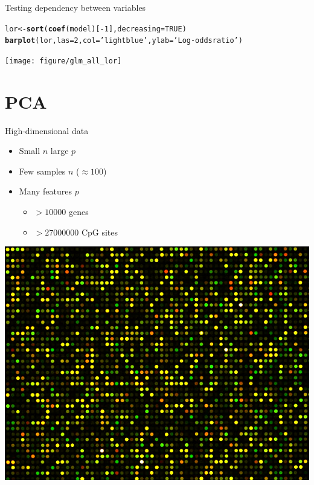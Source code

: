 \documentclass{beamer}\usepackage[]{graphicx}\usepackage[]{color}
\makeatletter
\newcommand{\hlnum}[1]{\textcolor[rgb]{0.686,0.059,0.569}{#1}}%
\newcommand{\hlstr}[1]{\textcolor[rgb]{0.192,0.494,0.8}{#1}}%
\newcommand{\hlopt}[1]{\textcolor[rgb]{0,0,0}{#1}}%
\newcommand{\hlstd}[1]{\textcolor[rgb]{0.345,0.345,0.345}{#1}}%
\newcommand{\hlkwb}[1]{\textcolor[rgb]{0.69,0.353,0.396}{#1}}%
\newcommand{\hlkwc}[1]{\textcolor[rgb]{0.333,0.667,0.333}{#1}}%
\newcommand{\hlkwd}[1]{\textcolor[rgb]{0.737,0.353,0.396}{\textbf{#1}}}%
\newenvironment{kframe}{%
 \def\at@end@of@kframe{}%
 \ifinner\ifhmode%
  \def\at@end@of@kframe{\end{minipage}}%
  \begin{minipage}{\columnwidth}%
 \fi\fi%
 \def\FrameCommand##1{\hskip\@totalleftmargin \hskip-\fboxsep
 \colorbox{shadecolor}{##1}\hskip-\fboxsep
     \hskip-\linewidth \hskip-\@totalleftmargin \hskip\columnwidth}%
 \MakeFramed {\advance\hsize-\width
   \@totalleftmargin\z@ \linewidth\hsize
   \@setminipage}}%
 {\par\unskip\endMakeFramed%
 \at@end@of@kframe}
\newenvironment{knitrout}{}{} %
\makeatother
\begin{document}
\begin{frame}[fragile]{Testing dependency between variables}
\begin{knitrout}\tiny
{}\color{fgcolor}\begin{kframe}
\begin{alltt}
\hlstd{lor} \hlkwb{<-} \hlkwd{sort}\hlstd{(}\hlkwd{coef}\hlstd{(model)[}\hlopt{-}\hlnum{1}\hlstd{],} \hlkwc{decreasing}\hlstd{=}\hlnum{TRUE}\hlstd{)}
\hlkwd{barplot}\hlstd{(lor,} \hlkwc{las}\hlstd{=}\hlnum{2}\hlstd{,} \hlkwc{col}\hlstd{=}\hlstr{'lightblue'}\hlstd{,} \hlkwc{ylab}\hlstd{=}\hlstr{'Log-odds ratio'}\hlstd{)}
\end{alltt}
\end{kframe}

{\centering \texttt{[image: figure/glm\_all\_lor]} 

}



\end{knitrout}
\end{frame}


\section{PCA}
\begin{frame}
\tableofcontents[currentsection]
\end{frame}

\begin{frame}{High-dimensional data}
  \begin{itemize}
    \item \alert{Small $n$ large $p$}
    \item Few samples $n$ ($\approx 100$)
    \item Many features $p$
      \begin{itemize}
        \item $> 10000$ genes
        \item $> 27000000$ CpG sites
      \end{itemize}
  \end{itemize}
  \begin{center}
    \includegraphics[width=.5\linewidth]{microarray.jpg}
  \end{center}
\end{frame}
\end{document}
